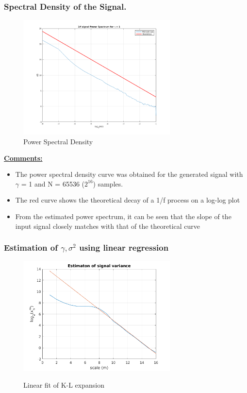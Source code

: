 \documentclass[a4paper]{article}
\begin{document}
\subsubsection{Spectral Density of the Signal.}

\begin{figure}
\vspace{-15pt}
\includegraphics[width=8cm]{spectrum.png}
\caption{Power Spectral Density}
\vspace{-100pt}
\end{figure} 

\underline{\textbf{Comments:}}
\begin{itemize}
\item The power spectral density curve was obtained for the generated signal with $\gamma$ = 1 and N = 65536 ($2^{16}$) samples. 
\item The red curve shows the theoretical decay of a 1/f process on a log-log plot
\item From the estimated power spectrum, it can be seen that the slope of the input signal closely matches with that of the theoretical curve

\end{itemize}
\vspace{2 cm}

\subsubsection{Estimation of $\gamma , \sigma^2 $ using linear regression}

\begin{figure}
\vspace{-15pt}
\includegraphics[width=8cm]{regression.png}
\label{fig:regr}
\caption{Linear fit of K-L expansion}
\vspace{-30pt}
\end{figure} 
\end{document}
